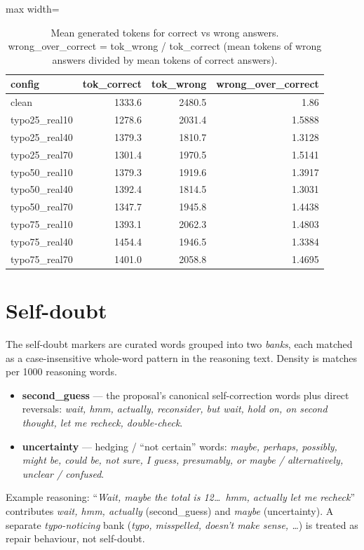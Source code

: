\documentclass[11pt]{article}
\begin{document}
\begin{table}[H]
\centering
\caption{Mean generated tokens for correct vs wrong answers. wrong\_over\_correct = tok\_wrong / tok\_correct (mean tokens of wrong answers divided by mean tokens of correct answers).}
\small
\begin{adjustbox}{max width=\textwidth}
\begin{tabular}{lrrr}
\toprule
\textbf{config} & \textbf{tok\_correct} & \textbf{tok\_wrong} & \textbf{wrong\_over\_correct} \\
\midrule
clean & 1333.6 & 2480.5 & 1.86 \\
typo25\_real10 & 1278.6 & 2031.4 & 1.5888 \\
typo25\_real40 & 1379.3 & 1810.7 & 1.3128 \\
typo25\_real70 & 1301.4 & 1970.5 & 1.5141 \\
typo50\_real10 & 1379.3 & 1919.6 & 1.3917 \\
typo50\_real40 & 1392.4 & 1814.5 & 1.3031 \\
typo50\_real70 & 1347.7 & 1945.8 & 1.4438 \\
typo75\_real10 & 1393.1 & 2062.3 & 1.4803 \\
typo75\_real40 & 1454.4 & 1946.5 & 1.3384 \\
typo75\_real70 & 1401.0 & 2058.8 & 1.4695 \\
\bottomrule
\end{tabular}
\end{adjustbox}
\end{table}

\section*{Self-doubt}
\noindent The self-doubt markers are curated words grouped into two
\emph{banks}, each matched as a case-insensitive whole-word pattern in the reasoning
text. Density is matches per 1000 reasoning words.
\begin{itemize}\setlength{\itemsep}{1pt}
  \item \textbf{second\_guess} --- the proposal's canonical self-correction words plus
  direct reversals: \emph{wait, hmm, actually, reconsider, but wait, hold on, on second
  thought, let me recheck, double-check}.
  \item \textbf{uncertainty} --- hedging / ``not certain'' words: \emph{maybe, perhaps,
  possibly, might be, could be, not sure, I guess, presumably, or maybe / alternatively,
  unclear / confused}.
\end{itemize}
\noindent Example reasoning: ``\emph{Wait, maybe the total is 12\dots\ hmm, actually let
me recheck}'' contributes \emph{wait, hmm, actually} (second\_guess) and \emph{maybe}
(uncertainty). A separate \emph{typo-noticing} bank (\emph{typo, misspelled, doesn't make
sense, \dots}) is treated as repair behaviour, not self-doubt.
\medskip
\end{document}
